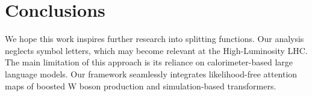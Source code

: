 \section{Conclusions}\label{sec:conclusions}

We hope this work inspires further research into splitting functions.
Our analysis neglects symbol letters, which may become relevant at the
High-Luminosity LHC. The main limitation of this approach is its
reliance on calorimeter-based large language models. Our framework
seamlessly integrates likelihood-free attention maps of boosted W boson
production and simulation-based transformers.

